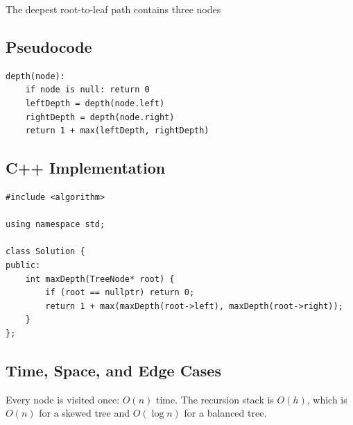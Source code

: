 \begin{visualbox}{The deepest root-to-leaf path contains three nodes}
\centering
{}
\end{visualbox}

\subsection{Pseudocode}
\begin{lstlisting}[style=pseudocode]
depth(node):
    if node is null: return 0
    leftDepth = depth(node.left)
    rightDepth = depth(node.right)
    return 1 + max(leftDepth, rightDepth)
\end{lstlisting}

\subsection{C++ Implementation}
\begin{lstlisting}[style=compactcode,caption={Complete C++ solution: Maximum Depth of Binary Tree}]
#include <algorithm>

using namespace std;

class Solution {
public:
    int maxDepth(TreeNode* root) {
        if (root == nullptr) return 0;
        return 1 + max(maxDepth(root->left), maxDepth(root->right));
    }
};
\end{lstlisting}

\subsection{Time, Space, and Edge Cases}
Every node is visited once: \(O(n)\) time. The recursion stack is \(O(h)\),
which is \(O(n)\) for a skewed tree and \(O(\log n)\) for a balanced tree.


